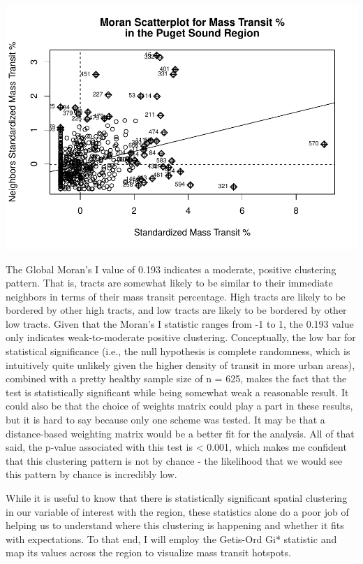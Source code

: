 \documentclass[
]{article}
\begin{document}
\includegraphics{transit-hotspots-PSRC_files/figure-latex/unnamed-chunk-11-1.pdf}

The Global Moran's I value of 0.193 indicates a moderate, positive
clustering pattern. That is, tracts are somewhat likely to be similar to
their immediate neighbors in terms of their mass transit percentage.
High tracts are likely to be bordered by other high tracts, and low
tracts are likely to be bordered by other low tracts. Given that the
Moran's I statistic ranges from -1 to 1, the 0.193 value only indicates
weak-to-moderate positive clustering. Conceptually, the low bar for
statistical significance (i.e., the null hypothesis is complete
randomness, which is intuitively quite unlikely given the higher density
of transit in more urban areas), combined with a pretty healthy sample
size of n = 625, makes the fact that the test is statistically
significant while being somewhat weak a reasonable result. It could also
be that the choice of weights matrix could play a part in these results,
but it is hard to say because only one scheme was tested. It may be that
a distance-based weighting matrix would be a better fit for the
analysis. All of that said, the p-value associated with this test is
\textless{} 0.001, which makes me confident that this clustering pattern
is not by chance - the likelihood that we would see this pattern by
chance is incredibly low.

While it is useful to know that there is statistically significant
spatial clustering in our variable of interest with the region, these
statistics alone do a poor job of helping us to understand where this
clustering is happening and whether it fits with expectations. To that
end, I will employ the Getis-Ord Gi* statistic and map its values across
the region to visualize mass transit hotspots.
\end{document}
